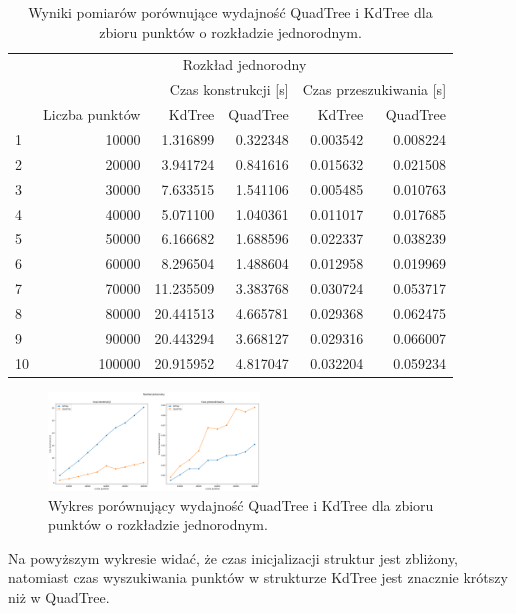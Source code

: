 \documentclass{lab}
\begin{document}
\begin{table}[H]
\centering
\begin{tabular}{lrrrrr}
  \toprule
   & \multicolumn{5}{c}{Rozkład jednorodny} \\
   &  & \multicolumn{2}{r}{Czas konstrukcji [s]} & \multicolumn{2}{r}{Czas przeszukiwania [s]} \\
   & Liczba punktów & KdTree & QuadTree & KdTree & QuadTree \\
  \midrule
  1 & 10000 & 1.316899 & 0.322348 & 0.003542 & 0.008224 \\
  2 & 20000 & 3.941724 & 0.841616 & 0.015632 & 0.021508 \\
  3 & 30000 & 7.633515 & 1.541106 & 0.005485 & 0.010763 \\
  4 & 40000 & 5.071100 & 1.040361 & 0.011017 & 0.017685 \\
  5 & 50000 & 6.166682 & 1.688596 & 0.022337 & 0.038239 \\
  6 & 60000 & 8.296504 & 1.488604 & 0.012958 & 0.019969 \\
  7 & 70000 & 11.235509 & 3.383768 & 0.030724 & 0.053717 \\
  8 & 80000 & 20.441513 & 4.665781 & 0.029368 & 0.062475 \\
  9 & 90000 & 20.443294 & 3.668127 & 0.029316 & 0.066007 \\
  10 & 100000 & 20.915952 & 4.817047 & 0.032204 & 0.059234 \\
  \bottomrule
\end{tabular}
\caption{Wyniki pomiarów porównujące wydajność QuadTree i KdTree dla zbioru punktów o rozkładzie jednorodnym.}
\label{tab:uniform_time}
\end{table}

\begin{figure}[H]
  \centering
  \includegraphics[width=0.5\textwidth]{resources/uniform_graph.png}
  \caption{Wykres porównujący wydajność QuadTree i KdTree dla zbioru punktów o rozkładzie jednorodnym.}
  \label{fig:uniform_graph}
\end{figure}

Na powyższym wykresie widać, że czas inicjalizacji struktur jest zbliżony, natomiast czas wyszukiwania punktów w strukturze KdTree jest znacznie krótszy niż w QuadTree.
\end{document}
